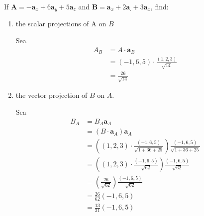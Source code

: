 \begin{problema}
    If $\mathbf{A}=-\mathbf{a}_{x}+6 \mathbf{a}_{y}+5 \mathbf{a}_{z}$ and $\mathbf{B}=\mathbf{a}_{x}+2 \mathbf{a}_{.}+3 \mathbf{a}_{x}$, find:
    \begin{enumerate}
        \item the scalar projections of $\mathrm{A}$ on $B$
        \begin{sol}
            Sea 
            \begin{align*}
                A_B &= A\cdot \mathbf{a}_B\\
                &= (-1,6,5)\cdot \frac{(1,2,3)}{\sqrt{14}}\\
                &= \frac{26}{\sqrt{14}}
            \end{align*}
        \end{sol} 
        \item the vector projection of $B$ on $A$.
        \begin{sol}
            Sea 
            \begin{align*}
                B_A &= B_A\mathbf{a}_A\\
                    &= (B\cdot\mathbf{a}_A)\mathbf{a}_A\\
                    &= \left((1,2,3)\cdot \frac{(-1,6,5)}{\sqrt{1+36+25}}\right) \frac{(-1,6,5)}{\sqrt{1+36+25}}\\
                    &= \left((1,2,3)\cdot \frac{(-1,6,5)}{\sqrt{62}}\right) \frac{(-1,6,5)}{\sqrt{62}}\\
                    &= \left(\frac{26}{\sqrt{62}}\right)\frac{(-1,6,5)}{\sqrt{62}}\\
                    &= \frac{26}{62}(-1,6,5)\\
                    &= \frac{13}{31}(-1,6,5)
            \end{align*}
        \end{sol}
    \end{enumerate}
    
\end{problema}

